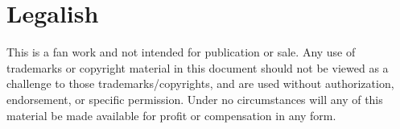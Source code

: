 \section{Legalish}
\begin{centering}
This is a fan work and not intended for publication or sale.
Any use of trademarks or copyright material in this document should not be viewed as a challenge to
those trademarks/copyrights, and are used without authorization, endorsement, or specific permission.
Under no circumstances will any of this material be made available for profit or compensation in any form.
\end{centering}
